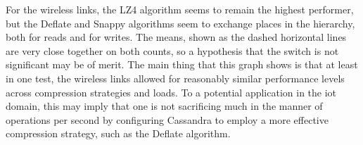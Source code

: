	For the wireless links, the LZ4 algorithm seems to remain the highest performer, but the Deflate and Snappy algorithms seem to exchange places in the hierarchy, both for reads and for writes.  The means, shown as the dashed horizontal lines are very close together on both counts, so a hypothesis that the switch is not significant may be of merit.  The main thing that this graph shows is that at least in one test, the wireless links allowed for reasonably similar performance levels across compression strategies and loads.  To a potential application in the \gls{iot} domain, this may imply that one is not sacrificing much in the manner of operations per second by configuring Cassandra to employ a more effective compression strategy, such as the Deflate algorithm.


